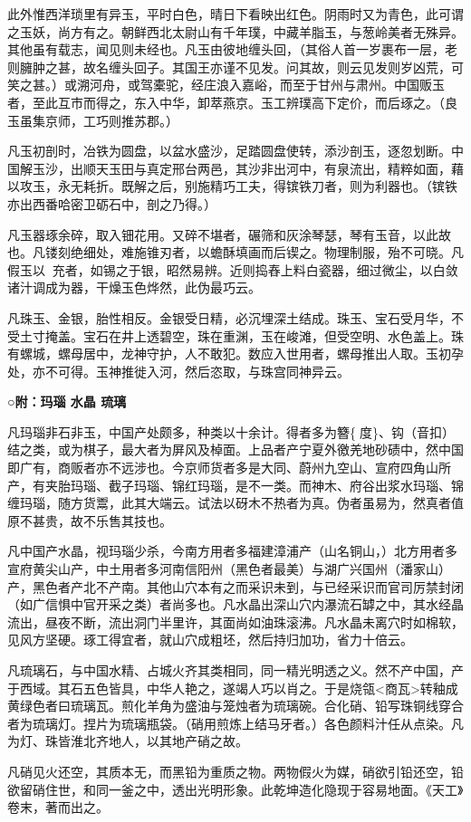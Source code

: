 \documentclass[]{article}
\begin{document}
此外惟西洋琐里有异玉，平时白色，晴日下看映出红色。阴雨时又为青色，此可谓之玉妖，尚方有之。朝鲜西北太尉山有千年璞，中藏羊脂玉，与葱岭美者无殊异。其他虽有载志，闻见则未经也。凡玉由彼地缠头回，（其俗人首一岁裹布一层，老则臃肿之甚，故名缠头回子。其国王亦谨不见发。问其故，则云见发则岁凶荒，可笑之甚。）或溯河舟，或驾橐驼，经庄浪入嘉峪，而至于甘州与肃州。中国贩玉者，至此互市而得之，东入中华，卸萃燕京。玉工辨璞高下定价，而后琢之。（良玉虽集京师，工巧则推苏郡。）

凡玉初剖时，冶铁为圆盘，以盆水盛沙，足踏圆盘使转，添沙剖玉，逐忽划断。中国解玉沙，出顺天玉田与真定邢台两邑，其沙非出河中，有泉流出，精粹如面，藉以攻玉，永无耗折。既解之后，别施精巧工夫，得镔铁刀者，则为利器也。（镔铁亦出西番哈密卫砺石中，剖之乃得。）

凡玉器琢余碎，取入钿花用。又碎不堪者，碾筛和灰涂琴瑟，琴有玉音，以此故也。凡镂刻绝细处，难施锥刃者，以蟾酥填画而后锲之。物理制服，殆不可晓。凡假玉以充者，如锡之于银，昭然易辨。近则捣舂上料白瓷器，细过微尘，以白敛诸汁调成为器，干燥玉色烨然，此伪最巧云。

凡珠玉、金银，胎性相反。金银受日精，必沉埋深土结成。珠玉、宝石受月华，不受土寸掩盖。宝石在井上透碧空，珠在重渊，玉在峻滩，但受空明、水色盖上。珠有螺城，螺母居中，龙神守护，人不敢犯。数应入世用者，螺母推出人取。玉初孕处，亦不可得。玉神推徙入河，然后恣取，与珠宫同神异云。

\textbf{○附：玛瑙 水晶 琉璃}

凡玛瑙非石非玉，中国产处颇多，种类以十余计。得者多为簪\{度\}、钩（音扣）结之类，或为棋子，最大者为屏风及棹面。上品者产宁夏外徼羌地砂碛中，然中国即广有，商贩者亦不远涉也。今京师货者多是大同、蔚州九空山、宣府四角山所产，有夹胎玛瑙、截子玛瑙、锦红玛瑙，是不一类。而神木、府谷出浆水玛瑙、锦缠玛瑙，随方货鬻，此其大端云。试法以砑木不热者为真。伪者虽易为，然真者值原不甚贵，故不乐售其技也。

凡中国产水晶，视玛瑙少杀，今南方用者多福建漳浦产（山名铜山，）北方用者多宣府黄尖山产，中土用者多河南信阳州（黑色者最美）与湖广兴国州（潘家山）产，黑色者产北不产南。其他山穴本有之而采识未到，与已经采识而官司厉禁封闭（如广信惧中官开采之类）者尚多也。凡水晶出深山穴内瀑流石罅之中，其水经晶流出，昼夜不断，流出洞门半里许，其面尚如油珠滚沸。凡水晶未离穴时如棉软，见风方坚硬。琢工得宜者，就山穴成粗坯，然后持归加功，省力十倍云。

凡琉璃石，与中国水精、占城火齐其类相同，同一精光明透之义。然不产中国，产于西域。其石五色皆具，中华人艳之，遂竭人巧以肖之。于是烧瓴\textless{}商瓦\textgreater{}转釉成黄绿色者曰琉璃瓦。煎化羊角为盛油与笼烛者为琉璃碗。合化硝、铅写珠铜线穿合者为琉璃灯。捏片为琉璃瓶袋。（硝用煎炼上结马牙者。）各色颜料汁任从点染。凡为灯、珠皆淮北齐地人，以其地产硝之故。

凡硝见火还空，其质本无，而黑铅为重质之物。两物假火为媒，硝欲引铅还空，铅欲留硝住世，和同一釜之中，透出光明形象。此乾坤造化隐现于容易地面。《天工》卷末，著而出之。
\end{document}
